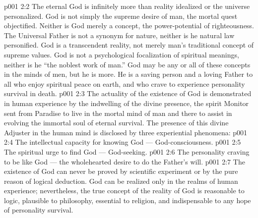 \vs p001 2:2 \pc The eternal God is infinitely more than reality idealized or the universe personalized. God is not simply the supreme desire of man, the mortal quest objectified. Neither is God merely a concept, the power\hyp{}potential of righteousness. The Universal Father is not a synonym for nature, neither is he natural law personified. God is a transcendent reality, not merely man’s traditional concept of supreme values. God is not a psychological focalization of spiritual meanings, neither is he “the noblest work of man.” God may be any or all of these concepts in the minds of men, but he is more. He is a saving person and a loving Father to all who enjoy spiritual peace on earth, and who crave to experience personality survival in death.
\vs p001 2:3 \pc The actuality of the existence of God is demonstrated in human experience by the indwelling of the divine presence, the spirit Monitor sent from Paradise to live in the mortal mind of man and there to assist in evolving the immortal soul of eternal survival. The presence of this divine Adjuster in the human mind is disclosed by three experiential phenomena:
\vs p001 2:4 \bibnobreakspace The intellectual capacity for knowing God --- God\hyp{}consciousness.
\vs p001 2:5 \bibnobreakspace The spiritual urge to find God --- God\hyp{}seeking.
\vs p001 2:6 \bibnobreakspace The personality craving to be like God --- the wholehearted desire to do the Father’s will.
\vs p001 2:7 \pc The existence of God can never be proved by scientific experiment or by the pure reason of logical deduction. God can be realized only in the realms of human experience; nevertheless, the true concept of the reality of God is reasonable to logic, plausible to philosophy, essential to religion, and indispensable to any hope of personality survival.
